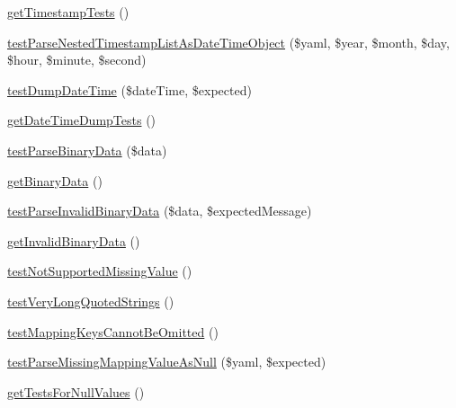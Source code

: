 \begin{DoxyCompactItemize}
\item 
\mbox{\hyperlink{class_symfony_1_1_component_1_1_yaml_1_1_tests_1_1_inline_test_a95433e5a44a93b0d0f5ef8984ee36ec7}{get\+Timestamp\+Tests}} ()
\item 
\mbox{\hyperlink{class_symfony_1_1_component_1_1_yaml_1_1_tests_1_1_inline_test_a86b050ef8979ba651968cb0e3ebab197}{test\+Parse\+Nested\+Timestamp\+List\+As\+Date\+Time\+Object}} (\$yaml, \$year, \$month, \$day, \$hour, \$minute, \$second)
\item 
\mbox{\hyperlink{class_symfony_1_1_component_1_1_yaml_1_1_tests_1_1_inline_test_a728ac481ab937f192c8b2991b5236254}{test\+Dump\+Date\+Time}} (\$date\+Time, \$expected)
\item 
\mbox{\hyperlink{class_symfony_1_1_component_1_1_yaml_1_1_tests_1_1_inline_test_a0f690fb3228c31deb3972065992c1103}{get\+Date\+Time\+Dump\+Tests}} ()
\item 
\mbox{\hyperlink{class_symfony_1_1_component_1_1_yaml_1_1_tests_1_1_inline_test_ab1cdad2c5d1b326e97e5869124e599be}{test\+Parse\+Binary\+Data}} (\$data)
\item 
\mbox{\hyperlink{class_symfony_1_1_component_1_1_yaml_1_1_tests_1_1_inline_test_afb7f946c9c44d742389e7519763dd22e}{get\+Binary\+Data}} ()
\item 
\mbox{\hyperlink{class_symfony_1_1_component_1_1_yaml_1_1_tests_1_1_inline_test_a3c28a0d9f12b6c65fe69b5f7f0ea5773}{test\+Parse\+Invalid\+Binary\+Data}} (\$data, \$expected\+Message)
\item 
\mbox{\hyperlink{class_symfony_1_1_component_1_1_yaml_1_1_tests_1_1_inline_test_a4a20463b06f266fba70ebc074a558419}{get\+Invalid\+Binary\+Data}} ()
\item 
\mbox{\hyperlink{class_symfony_1_1_component_1_1_yaml_1_1_tests_1_1_inline_test_af81792662841a8f1e2f484f925744793}{test\+Not\+Supported\+Missing\+Value}} ()
\item 
\mbox{\hyperlink{class_symfony_1_1_component_1_1_yaml_1_1_tests_1_1_inline_test_a382124c5954ee2092249a61a4f94c91d}{test\+Very\+Long\+Quoted\+Strings}} ()
\item 
\mbox{\hyperlink{class_symfony_1_1_component_1_1_yaml_1_1_tests_1_1_inline_test_a7ba8d4e01c565c3b57ad57d6472372a6}{test\+Mapping\+Keys\+Cannot\+Be\+Omitted}} ()
\item 
\mbox{\hyperlink{class_symfony_1_1_component_1_1_yaml_1_1_tests_1_1_inline_test_a201ee663c47c81fae3ed598f45233619}{test\+Parse\+Missing\+Mapping\+Value\+As\+Null}} (\$yaml, \$expected)
\item 
\mbox{\hyperlink{class_symfony_1_1_component_1_1_yaml_1_1_tests_1_1_inline_test_a4e86b634b6c5457cfcc1a1dcb70ab8f1}{get\+Tests\+For\+Null\+Values}} ()

\end{DoxyCompactItemize}
